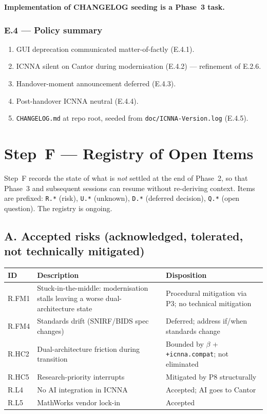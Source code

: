 \documentclass[11pt,a4paper]{article}
\begin{document}
\textbf{Implementation of CHANGELOG seeding is a Phase~3 task.}

\subsubsection{E.4 --- Policy summary}

\begin{enumerate}[nosep]
    \item GUI deprecation communicated matter-of-factly (E.4.1).
    \item ICNNA silent on Cantor during modernisation (E.4.2) --- refinement of E.2.6.
    \item Handover-moment announcement deferred (E.4.3).
    \item Post-handover ICNNA neutral (E.4.4).
    \item \texttt{CHANGELOG.md} at repo root, seeded from \texttt{doc/ICNNA-Version.log} (E.4.5).
\end{enumerate}

\section{Step~F --- Registry of Open Items}

Step~F records the state of what is \emph{not} settled at the end of Phase~2, so that Phase~3 and subsequent sessions can resume without re-deriving context. Items are prefixed: \texttt{R.*} (risk), \texttt{U.*} (unknown), \texttt{D.*} (deferred decision), \texttt{Q.*} (open question). The registry is ongoing.

\subsection{A. Accepted risks (acknowledged, tolerated, not technically mitigated)}

\begin{longtable}{p{2cm}p{10cm}p{3cm}}
\toprule
\textbf{ID} & \textbf{Description} & \textbf{Disposition} \\
\midrule
\endhead
R.FM1 & Stuck-in-the-middle: modernisation stalls leaving a worse dual-architecture state & Procedural mitigation via P3; no technical mitigation \\
R.FM4 & Standards drift (SNIRF/BIDS spec changes) & Deferred; address if/when standards change \\
R.HC2 & Dual-architecture friction during transition & Bounded by $\beta$ + \texttt{+icnna.compat}; not eliminated \\
R.HC5 & Research-priority interrupts & Mitigated by P8 structurally \\
R.L4 & No AI integration in ICNNA & Accepted; AI goes to Cantor \\
R.L5 & MathWorks vendor lock-in & Accepted \\
\bottomrule
\end{longtable}
\end{document}
